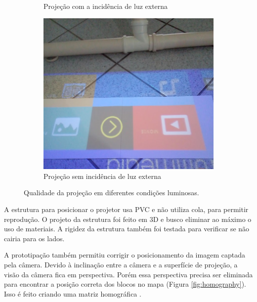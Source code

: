 \begin{figure}[h]
\begin{subfigure}{.33\textwidth}
        \caption{Projeção com a incidência de luz externa}
        \label{fig:projection_day}
    \end{subfigure}%
    \begin{subfigure}{.33\textwidth}
        \centering
        \includegraphics[width=.9\linewidth,fbox]{figs/projection_night.png}
        \caption{Projeção sem incidência de luz externa}
        \label{fig:projection_night}
    \end{subfigure}%
    \caption{Qualidade da projeção em diferentes condições luminosas.}
    \sourceauthor
    \label{fig:proj_light}
\end{figure}
A estrutura para posicionar o projetor usa PVC e não utiliza cola, para permitir reprodução. O projeto da estrutura foi feito em 3D e busco eliminar ao máximo o uso de materiais. A rigidez da estrutura também foi testada para verificar se não cairia para os lados.

A prototipação também permitiu corrigir o posicionamento da imagem captada pela câmera. Devido à inclinação entre a câmera e a superfície de projeção, a visão da câmera fica em perspectiva. Porém essa perspectiva precisa ser eliminada para encontrar a posição correta dos blocos no mapa (Figura \ref{fig:homography}). Isso é feito criando uma matriz homográfica \cite{dubrofsky_homography_2009}. 

